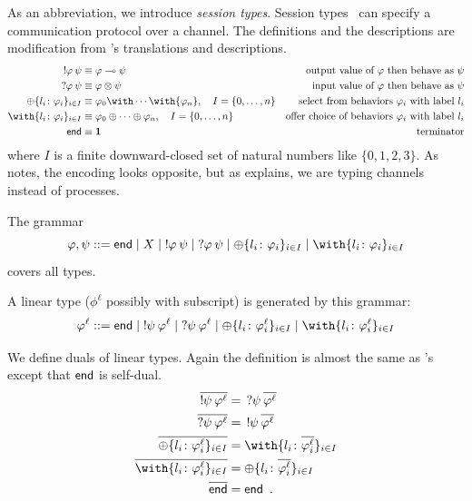     As an abbreviation, we introduce \textit{session
    types}.
    Session types~\cite{honda-session} can specify a communication
    protocol over a channel.
    The definitions and the descriptions are modification from
    \citet{wadler2012propositions}'s translations and descriptions.
    \begin{align*}
     \sendtype\phi\psi&\equiv \phi\limp\psi &\text{
     output value of $\phi$ then behave as $\psi$} \\
     \recvtype\phi\psi&\equiv \phi\otimes\psi &\text{input value of
     $\phi$ then behave as $\psi$}\\
     \oplus\{l_i\colon \phi_i\}_{i\in I} &\equiv {\phi_0}\with
     \cdots \with {\phi_n}, \quad I = \{0,\ldots,n\} & \text{select from behaviors
     $\phi_i$ with label $l_i$}\\
     \with\{l_i\colon \phi_i\}_{i\in I} &\equiv {\phi_0}\oplus
     \cdots \oplus {\phi_n}, \quad I = \{0,\ldots,n\}& \text{offer choice of
     behaviors $\phi_i$ with label $l_i$}
     \\
     \terminate &\equiv \one &\text{terminator}
    \end{align*}
    where $I$ is a finite downward-closed set of natural numbers like
    $\{0,1,2,3\}$.
    As \citet{wadler2012propositions} notes, the encoding looks
    opposite, but as \citet{wadler2012propositions} explains, we are
    typing channels instead of processes.

    The grammar
    \[
     \phi,\psi ::= \terminate\mid X \mid \sendtype\phi\psi \mid
     \recvtype\phi\psi
     \mid \oplus\{l_i\colon\phi_i\}_{i\in I}
     \mid \with\{l_i\colon\phi_i\}_{i\in I}
    \]
    covers all types.

    A linear type ($\phi^\ell$ possibly with subscript) is generated by
    this grammar:
    \[
     \phi^\ell ::= \terminate\mid
     \sendtype{\psi}{\phi^\ell} \mid
     \recvtype{\psi}{\phi^\ell}
     \mid \oplus\{l_i\colon\phi^\ell_i\}_{i\in I}
     \mid \with\{l_i\colon\phi^\ell_i\}_{i\in I}
    \]

    We define duals of linear types.
    Again the definition is almost the
    same as \citet{wadler2012propositions}'s except that $\mathsf{end}$ is
    self-dual.
    \begin{align*}
     \overline{\sendtype\psi{\phi^\ell}}&= \,\recvtype\psi{\overline{\phi^\ell}}\\
     \overline{\recvtype\psi{\phi^\ell}}&= \,\sendtype\psi{\overline{\phi^\ell}}\\
     \overline{\oplus\{l_i\colon \phi^\ell_i\}_{i\in I}} &=
     \with\{l_i\colon \overline{\phi^\ell_i}\}_{i\in I} \\
     \overline{\with\{l_i\colon \phi^\ell_i\}_{i\in I}} &=
     \oplus\{l_i\colon \overline{\phi^\ell_i}\}_{i\in I} \\
     \overline{\terminate} &= \terminate\enspace.
    \end{align*}

